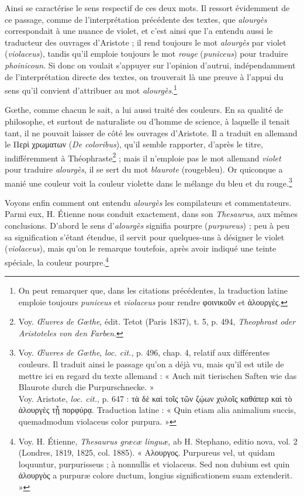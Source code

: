 \documentclass[a4paper, 11pt, oneside, polutonikogreek, french]{article}
\begin{document}
Ainsi se caractérise le sens respectif de ces deux mots. Il ressort évidemment de ce passage, comme de l'interprétation précédente des textes, que \emph{alourgès} correspondait à une nuance de violet, et c'est ainsi que l'a entendu aussi le traducteur des ouvrages d'Aristote ; il rend toujours le mot \emph{alourgès} par violet (\emph{violaceus}), tandis qu'il emploie toujours le mot \emph{rouge} (\emph{puniceus}) pour traduire \emph{phoinicoun}. Si donc on voulait s'appuyer sur l'opinion d'autrui, indépendamment de l'interprétation directe des textes, on trouverait là une preuve à l'appui du sens qu'il convient d'attribuer au mot \emph{alourgès}.\footnote{On peut remarquer que, dans les citations précédentes, la traduction latine emploie toujours \emph{puniceus} et \emph{violaceus} pour rendre φοινικοῦν et ἁλουργὲς.}

Gœthe, comme chacun le sait, a lui aussi traité des couleurs. En sa qualité de philosophe, et surtout de naturaliste ou d'homme de science, à laquelle il tenait tant, il ne pouvait laisser de côté les ouvrages d'Aristote. Il a traduit en allemand le Περὶ χρωματων (\emph{De coloribus}), qu'il semble rapporter, d'après le titre, indifféremment à Théophraste\footnote{Voy. \emph{Œuvres de Gœthe}, édit. Tetot (Paris 1837), t. 5, p. 494, \emph{Theophrast oder Aristoteles von den Farben}.} ; mais il n'emploie pas le mot allemand \emph{violet} pour traduire \emph{alourgès}, il se sert du mot \emph{blaurote} (rougebleu). Or quiconque a manié une couleur voit la couleur violette dans le mélange du bleu et du rouge.\footnote{Voy. \emph{Œuvres de Gœthe}, \emph{loc. cit.}, p. 496, chap. 4, relatif aux différentes couleurs. Il traduit ainsi le passage qu'on a déjà vu, mais qu'il est utile de mettre ici en regard du texte allemand : « Auch mit tierischen Saften wie das Blaurote durch die Purpurschnecke. »\\\hspace*{5mm}Voy. Aristote, \emph{loc. cit.}, p. 647 : τὰ δὲ καὶ τοῖς τῶν ζῴων χυλοῖς καθάπερ καὶ τὸ ἁλουργὲς τᾖ πορφύρᾳ. Traduction latine : « Quin etiam alia animalium succis, quemadmodum violaceus color purpura. »}

Voyons enfin comment ont entendu \emph{alourgès} les compilateurs et commentateurs. Parmi eux, H. Étienne nous conduit exactement, dans son \emph{Thesaurus}, aux mêmes conclusions. D'abord le sens d'\emph{alourgès} signifia pourpre (\emph{purpureus}) ; peu à peu sa signification s'étant étendue, il servit pour quelques-uns à désigner le violet (\emph{violaceus}), mais qu'on le remarque toutefois, après avoir indiqué une teinte spéciale, la couleur pourpre.\footnote{Voy. H. Étienne, \emph{Thesaurus græcæ linguæ}, ab H. Stephano, editio nova, vol. 2 (Londres, 1819, 1825, col. 1885). « Αλουργος. Purpureus vel, ut quidam loquuntur, purpurisseus ; à nonnullis et violaceus. Sed non dubium est quin ἁλουργὸς a purpuræ colore ductum, longius significationem suam extenderit. »}
\end{document}
